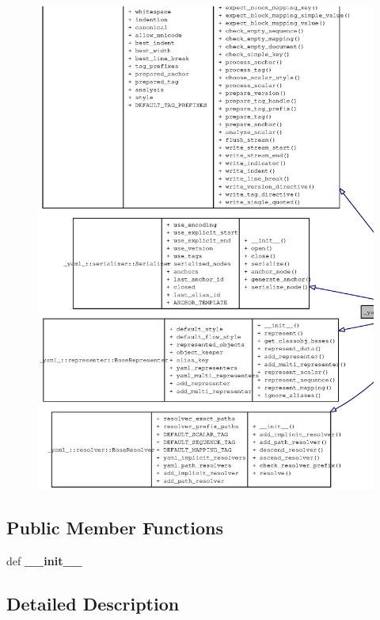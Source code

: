 \begin{figure}[H]
\begin{center}
\leavevmode
\includegraphics[width=400pt]{class__yaml___1_1dumper_1_1BaseDumper__coll__graph}
\end{center}
\end{figure}
\subsection*{Public Member Functions}
\begin{CompactItemize}
\item 
def {\bf \_\-\_\-init\_\-\_\-}
\end{CompactItemize}


\subsection{Detailed Description}


